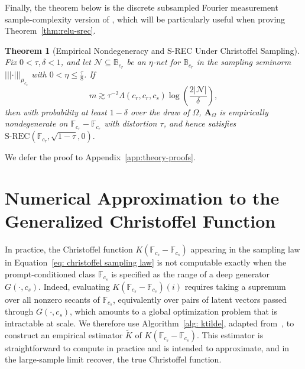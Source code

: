 \documentclass{article}
\theoremstyle{plain}
\newtheorem{theorem}{Theorem}[section]
\theoremstyle{definition}
\theoremstyle{remark}
\newcommand*{\snorm}[2]{\left\vert\!\left\vert\!\left\vert #1 \right\vert\!\right\vert\!\right\vert_{#2}}
\begin{document}
Finally, the theorem below is the discrete subsampled Fourier measurement sample-complexity version of \cite[Theorem~4.2]{adcock2023cs4ml}, which will be particularly useful when proving Theorem~\ref{thm:relu-srec}.

\begin{theorem}[Empirical Nondegeneracy and S-REC Under Christoffel Sampling]
  \label{thm:christoffel-srec}
  Fix $0<\tau,\delta<1$, and let $\mathcal N\subseteq \mathbb{B}_{c_r}$ be an $\eta$-net for $\mathbb{B}_{c_r}$ in the sampling seminorm $\snorm{\cdot}{\mu_{c_s}}$ with $0<\eta\leq \tfrac{\tau}{8}$. If
  \[
    m \gtrsim \tau^{-2}\Lambda\left(c_r,c_r,c_s\right)\log\left(\frac{2\left|\mathcal N\right|}{\delta}\right),
  \]
  then with probability at least $1-\delta$ over the draw of $\Omega$, $\mathbf A_\Omega$ is empirically nondegenerate on $\mathbb{F}_{c_r}-\mathbb{F}_{c_r}$ with distortion $\tau$, and hence satisfies
  $
  \mathrm{S\text{-}REC}\left(\mathbb{F}_{c_r},\sqrt{1-\tau},0\right).
  $
\end{theorem}

We defer the proof to Appendix~\ref{app:theory-proofs}.

\newpage \section{Numerical Approximation to the Generalized Christoffel Function}\label{app: further experiment details}
In practice, the Christoffel function $K(\mathbb F_{c_s}-\mathbb F_{c_s})$ appearing in the sampling law in Equation~\eqref{eq: christoffel sampling law} is not computable exactly when the prompt-conditioned class $\mathbb F_{c_s}$ is specified as the range of a deep generator $G(\cdot,c_s)$. Indeed, evaluating $K(\mathbb F_{c_s}-\mathbb F_{c_s})(i)$ requires taking a supremum over all nonzero secants of $\mathbb F_{c_s}$, equivalently over pairs of latent vectors passed through $G(\cdot,c_s)$, which amounts to a global optimization problem that is intractable at scale. We therefore use Algorithm~\ref{alg: ktilde}, adapted from~\cite[Algorithm~1]{adcock2023cs4ml}, to construct an empirical estimator $\widetilde K$ of $K(\mathbb F_{c_s}-\mathbb F_{c_s})$. This estimator is straightforward to compute in practice and is intended to approximate, and in the large-sample limit recover, the true Christoffel function.
\end{document}
